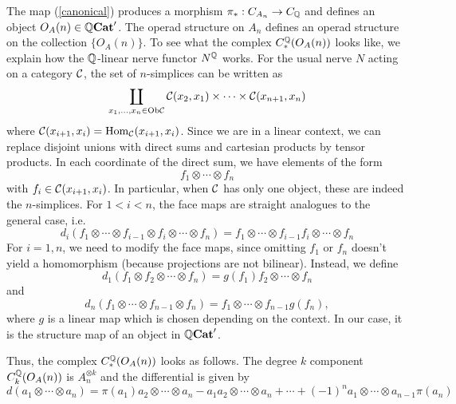 \documentclass[TFM.tex]{subfiles}
\begin{document}
The map (\ref{canonical}) produces a morphism $\pi_*: C_{A_n}\to C_{\mathbb{Q}}$ and defines an object
$O_A(n)\in \mathbb{Q}\mathrm{\mathbf{Cat}}'$. The operad structure on $A_n$ defines an operad structure on the
collection $\{O_A(n)\}$. 
To see what the complex $C_*^{\mathbb{Q}}(O_A(n))$ looks like, we explain how the $\mathbb{Q}$-linear nerve functor $N^{\mathbb{Q}}$ works. For the usual nerve $N$ acting on a category $\mathcal{C}$, the set of $n$-simplices can be written as
\[
\coprod_{x_1,\dots, x_n\in\mathrm{Ob}\mathcal{C}}\mathcal{C}(x_2,x_1)\times\cdots \times\mathcal{C}(x_{n+1},x_{n})
\]
where $\mathcal{C}(x_{i+1},x_i)=\operatorname{Hom}_{\mathcal{C}}(x_{i+1},x_i)$. Since we are in a linear context, we can replace disjoint unions with direct sums and cartesian products by tensor products. In each coordinate of the direct sum, we have elements of the form
\[
f_1\otimes\cdots \otimes f_{n}
\]
with $f_i\in \mathcal{C}(x_{i+1},x_i)$. In particular, when $\mathcal{C}$ has only one object, these are indeed the $n$-simplices. For $1<i<n$, the face maps are straight analogues to the general case, i.e. $$d_i(f_1\otimes\cdots \otimes f_{i-1}\otimes f_i\otimes \cdots\otimes f_n)=f_1\otimes\cdots \otimes f_{i-1}f_i\otimes\cdots \otimes f_n$$
For $i=1,n$, we need to modify the face maps, since omitting $f_1$ or $f_n$ doesn't yield a homomorphism (because projections are not bilinear). Instead, we define
\[
d_1(f_1\otimes f_2\otimes\cdots\otimes f_n)=g(f_1)f_2\otimes\cdots\otimes f_n
\]
and
\[
d_n(f_1\otimes\cdots\otimes f_{n-1}\otimes f_n)=f_1\otimes\cdots\otimes f_{n-1} g(f_n),
\]
where $g$ is a linear map which is chosen depending on the context. In our case, it is the structure map of an object in $\mathbb{Q}\mathrm{\mathbf{Cat}}'$.%

Thus, the complex $C_*^{\mathbb{Q}}(O_A(n))$ looks as follows. The degree $k$ component $C_k^{\mathbb{Q}}(O_A(n))$ is $A_n^{\otimes k}$ and the differential is given by %
\[
d(a_1\otimes\cdots\otimes a_n)=\pi(a_1)a_2\otimes\cdots\otimes a_n-a_1a_2\otimes \cdots\otimes a_n+\cdots+(-1)^{n}a_1\otimes\cdots\otimes a_{n-1}\pi(a_n)
\]
\end{document}
